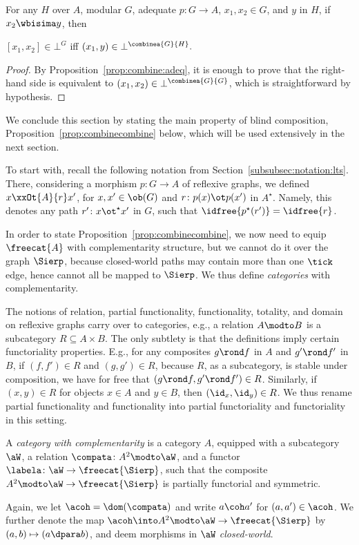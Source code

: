 \documentclass{LMCS}
\theoremstyle{plain}\newtheorem{satz}[thm]{Satz}
\begin{document}
\begin{prop}
  For any $H$ over $A$, modular $G$, adequate $p \colon G \to A$, $x_1,x_2 \in G$, and
  $y$ in $H$, if $x_2 \wbisima y$, then
  \begin{center}
    $[x_1,x_2] \in \bot^G$ iff $(x_1,y) \in \bot^{\combinea{G}{H}}.$
  \end{center}
\end{prop}
\begin{proof}
  By Proposition~\ref{prop:combine:adeq}, it is enough to prove that
  the right-hand side is equivalent to $(x_1,x_2) \in
  \bot^{\combinea{G}{G}}$, which is straightforward by hypothesis.
\end{proof}



We conclude this section by stating the main property of blind
composition, Proposition~\ref{prop:combinecombine} below, which will
be used extensively in the next section.

To start with, recall the following notation from
Section~\ref{subsubsec:notation:lts}. There, considering a morphism $p
\colon G \to A$ of reflexive graphs, we defined $x \xxOt{A}{r} x'$,
for $x,x' \in \ob(G)$ and $r \colon p(x) \ot p(x')$ in
$A^\star$.  Namely, this denotes any path $r' \colon x \ot^\star
x'$ in $G$, such that $\idfree{p^\star(r')} = \idfree{r}$.

In order to state Proposition~\ref{prop:combinecombine}, we now need
to equip $\freecat{A}$ with complementarity structure, but we cannot
do it over the graph $\Sierp$, because closed-world paths may contain
more than one $\tick$ edge, hence cannot all be mapped to $\Sierp$.  We
thus define \emph{categories} with complementarity.

The notions of relation, partial functionality, functionality,
totality, and domain on reflexive graphs carry over to categories,
e.g., a relation $A \modto B$ is a subcategory $R \subseteq A \times
B$. The only subtlety is that the definitions imply certain
functoriality properties.  E.g., for any composites $g \rond f$ in $A$
and $g' \rond f'$ in $B$, if $(f,f') \in R$ and $(g,g') \in R$,
because $R$, as a subcategory, is stable under composition, we have
for free that $(g \rond f, g' \rond f') \in R$.  Similarly, if $(x,y)
\in R$ for objects $x \in A$ and $y \in B$, then $(\id_x, \id_y) \in
R$.  We thus rename partial functionality and functionality into
partial functoriality and functoriality in this setting.
\begin{defi}
  A \emph{category with complementarity} is a category $A$, equipped
  with a subcategory $\aW$, a relation $\compata \colon A^2 \modto
  \aW$, and a functor $\labela \colon \aW \to \freecat{\Sierp}$, such
  that the composite $A^2 \modto \aW \to \freecat{\Sierp}$ is
  partially functorial and symmetric.
\end{defi}
Again, we let $\acoh = \dom(\compata)$ and write $a \coh a'$ for
$(a,a') \in \acoh$. We further denote the map $\acoh \into A^2 \modto
\aW \to \freecat{\Sierp}$ by $(a,b) \mapsto (a \dpara b)$, and deem
morphisms in $\aW$ \emph{closed-world}.
\end{document}

